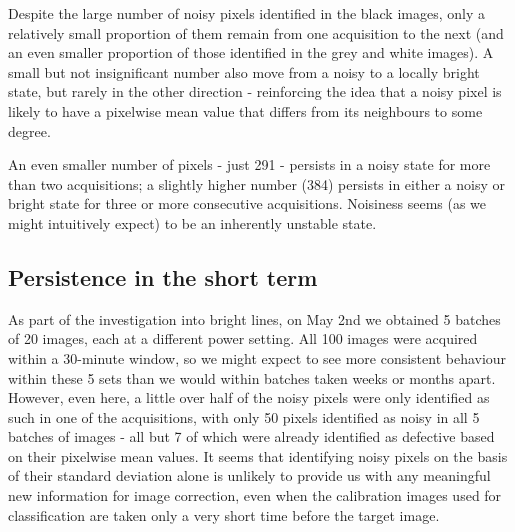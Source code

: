 \documentclass[10pt,fleqn]{article}
\begin{document}
Despite the large number of noisy pixels identified in the black images, only a relatively small proportion of them remain from one acquisition to the next (and an even smaller proportion of those identified in the grey and white images). A small but not insignificant number also move from a noisy to a locally bright state, but rarely in the other direction - reinforcing the idea that a noisy pixel is likely to have a pixelwise mean value that differs from its neighbours to some degree.

An even smaller number of pixels - just 291 - persists in a noisy state for more than two acquisitions; a slightly higher number (384) persists in either a noisy or bright state for three or more consecutive acquisitions. Noisiness seems (as we might intuitively expect) to be an inherently unstable state. 




\FloatBarrier
\subsection{Persistence in the short term}

As part of the investigation into bright lines, on May 2nd we obtained 5 batches of 20 images, each at a different power setting. All 100 images were acquired within a 30-minute window, so we might expect to see more consistent behaviour within these 5 sets than we would within batches taken weeks or months apart. However, even here, a little over half of the noisy pixels were only identified as such in one of the acquisitions, with only 50 pixels identified as noisy in all 5 batches of images - all but 7 of which were already identified as defective based on their pixelwise mean values. It seems that identifying noisy pixels on the basis of their standard deviation alone is unlikely to provide us with any meaningful new information for image correction, even when the calibration images used for classification are taken only a very short time before the target image. 
\end{document}
